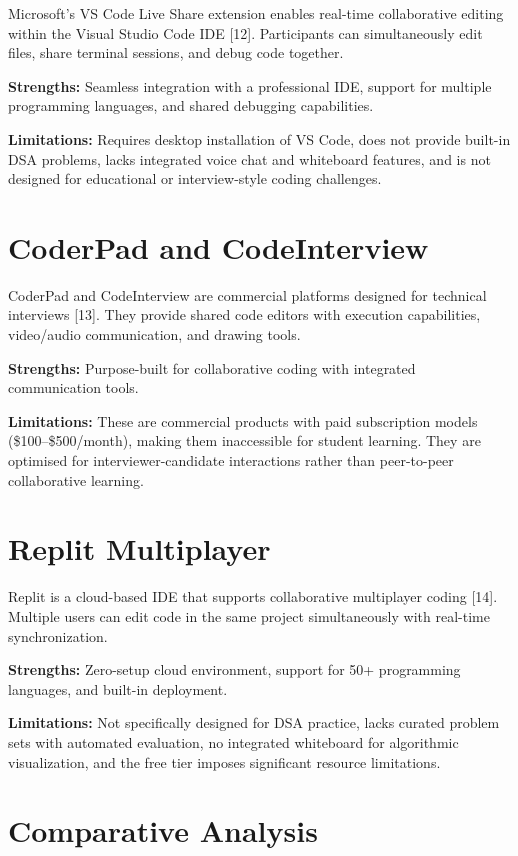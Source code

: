 \documentclass[12pt,a4paper,oneside]{report}
\begin{document}
Microsoft's VS Code Live Share extension enables real-time collaborative editing within the Visual Studio Code IDE [12]. Participants can simultaneously edit files, share terminal sessions, and debug code together.

\textbf{Strengths:} Seamless integration with a professional IDE, support for multiple programming languages, and shared debugging capabilities.

\textbf{Limitations:} Requires desktop installation of VS Code, does not provide built-in DSA problems, lacks integrated voice chat and whiteboard features, and is not designed for educational or interview-style coding challenges.

\section{CoderPad and CodeInterview}

CoderPad and CodeInterview are commercial platforms designed for technical interviews [13]. They provide shared code editors with execution capabilities, video/audio communication, and drawing tools.

\textbf{Strengths:} Purpose-built for collaborative coding with integrated communication tools.

\textbf{Limitations:} These are commercial products with paid subscription models (\$100--\$500/month), making them inaccessible for student learning. They are optimised for interviewer-candidate interactions rather than peer-to-peer collaborative learning.

\section{Replit Multiplayer}

Replit is a cloud-based IDE that supports collaborative multiplayer coding [14]. Multiple users can edit code in the same project simultaneously with real-time synchronization.

\textbf{Strengths:} Zero-setup cloud environment, support for 50+ programming languages, and built-in deployment.

\textbf{Limitations:} Not specifically designed for DSA practice, lacks curated problem sets with automated evaluation, no integrated whiteboard for algorithmic visualization, and the free tier imposes significant resource limitations.

\section{Comparative Analysis}
\end{document}
